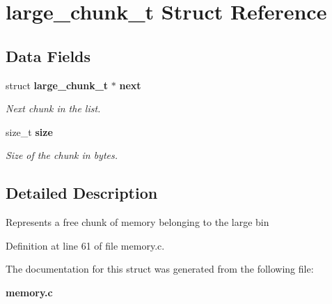 \section{large\_\-chunk\_\-t Struct Reference}
\label{structlarge__chunk__t}
\subsection*{Data Fields}
\begin{DoxyCompactItemize}
\item 
struct {\bf large\_\-chunk\_\-t} $\ast$ {\bf next}\label{structlarge__chunk__t_abd9aa45ddcdd6d0fc227a5dfcc445bf3}

\begin{DoxyCompactList}\small\item\em Next chunk in the list. \item\end{DoxyCompactList}\item 
size\_\-t {\bf size}\label{structlarge__chunk__t_ad37d6c2f2e94dc0bd5756dde55dea4cc}

\begin{DoxyCompactList}\small\item\em Size of the chunk in bytes. \item\end{DoxyCompactList}\end{DoxyCompactItemize}


\subsection{Detailed Description}
Represents a free chunk of memory belonging to the large bin 

Definition at line 61 of file memory.c.



The documentation for this struct was generated from the following file:\begin{DoxyCompactItemize}
\item 
{\bf memory.c}\end{DoxyCompactItemize}
